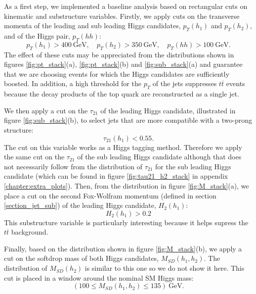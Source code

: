 As a first step, we implemented a baseline analysis based on rectangular cuts on kinematic and substructure variables. Firstly, we apply cuts on the transverse momenta of the leading and sub leading Higgs candidates, $p_T(h_1)$ and $p_T(h_2)$, and of the Higgs pair, $p_T(hh)$:
\begin{equation}
	p_T(h_1)>400 ~\text{GeV}, \quad p_T(h_2)>350 ~\text{GeV}, \quad p_T(hh)>100 ~\text{GeV}.
\end{equation}
The effect of these cuts may be appreciated from the distributions shown in figures \ref{fig:pt_stack}(a), \ref{fig:pt_stack}(b) and \ref{fig:sub_stack}(a) and guarantee that we are choosing events for which the Higgs candidates are sufficiently boosted. In addition, a high threshold for the $p_T$ of the jets suppresses $t\overline{t}$ events because the decay products of the top quark are reconstructed as a single jet.

We then apply a cut on the $\tau_{21}$ of the leading Higgs candidate, illustrated in figure \ref{fig:sub_stack}(b), to select jets that are more compatible with a two-prong structure:
\begin{equation}
	\tau_{21}(h_1)<0.55.
\end{equation}
The cut on this variable works as a Higgs tagging method. Therefore we apply the same cut on the $\tau_{21}$ of the sub leading Higgs candidate although that does not necessarily follow from the distribution of $\tau_{21}$ for the sub leading Higgs candidate (which can be found in figure \ref{fig:tau21_h2_stack} in appendix \ref{chapter:extra_plots}).
Then, from the distribution in figure \ref{fig:M_stack}(a), we place a cut on the second Fox-Wolfram momentum (defined in section \ref{section_jet_sub}) of the leading Higgs candidate, $H_2 (h_1)$:
\begin{equation}
	H_2 (h_1)>0.2
\end{equation}
This substructure variable is particularly interesting because it helps supress the $t\overline{t}$ background.

Finally, based on the distribution shown in figure \ref{fig:M_stack}(b), we apply a cut on the softdrop mass of both Higgs candidates, $M_{SD}(h_1,h_2)$. The distribution of $M_{SD}(h_2)$ is similar to this one so we do not show it here. This cut is placed in a window around the nominal SM Higgs mass:
\begin{equation}
	(100\leq M_{SD}(h_1,h_2)\leq 135) ~\text{GeV}.
\end{equation}

